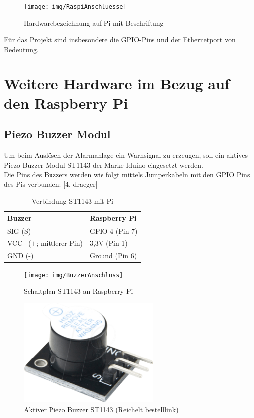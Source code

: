 \documentclass[12pt,a4paper,openany]{scrbook}
\begin{document}
	\begin{figure}[!h]
		\centering
		\texttt{[image: img/RaspiAnschluesse]}
		\caption{Hardwarebezeichnung auf Pi mit Beschriftung}
		\label{Bildlabel}
	\end{figure}
Für das Projekt sind insbesondere die GPIO-Pins und der Ethernetport von Bedeutung.\\

  

\section{Weitere Hardware im Bezug auf den Raspberry Pi}
\subsection{Piezo Buzzer Modul}
	Um beim Auslösen der Alarmanlage ein Warnsignal zu erzeugen, soll ein aktives Piezo Buzzer Modul ST1143 der Marke Iduino eingesetzt werden.\\ Die Pins des Buzzers werden wie folgt mittels Jumperkabeln mit den GPIO Pins des Pis verbunden: [4, draeger]
	
	\begin{table}[!h]
		\centering
		\begin{tabular}{|p{5cm}|p{5cm}|} 
			\hline
			Buzzer & Raspberry Pi  \\ 
			\hline
			SIG (S)   & GPIO 4 \hspace{0,1cm}(Pin 7)\\  
			\hline
			VCC~ ($+$; mittlerer Pin)   & 3,3V 	\hspace{0,7cm}(Pin 1)         \\ 
			\hline
			GND (-)    & Ground  	\hspace{0,2cm}(Pin 6)         \\
			\hline
		\end{tabular}
	\caption{Verbindung ST1143 mit Pi}
	\end{table} 

	
	\begin{figure}[!h]
	\centering
	\texttt{[image: img/BuzzerAnschluss]}
	\caption{Schaltplan ST1143 an Raspberry Pi}
	\label{Bildlabel}
	
\end{figure}

	\begin{figure}[H]
	\centering
	\includegraphics[height=150pt]{img/ST1143}
	\caption{Aktiver Piezo Buzzer ST1143 (Reichelt bestelllink)}
	\label{Bildlabel}
	\end{figure}
\end{document}
